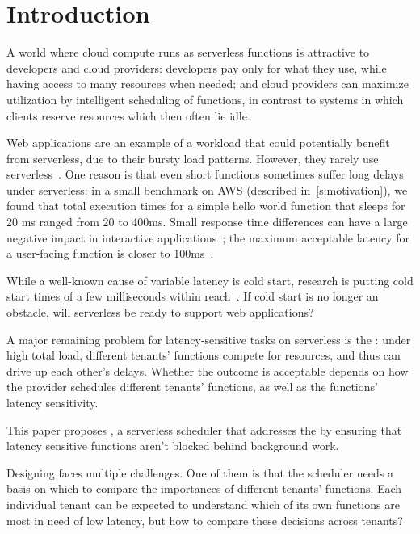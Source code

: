\section{Introduction}
\label{s:intro}

A world where cloud compute runs as serverless functions is attractive to
developers and cloud providers: developers pay only for what they use, while having
access to many resources when needed; and cloud providers can maximize
utilization by intelligent scheduling of functions, in contrast to systems in
which clients reserve resources which then often lie idle.

Web applications are an example of a workload that could potentially benefit
from serverless, due to their bursty load patterns. However, they rarely use
serverless~\cite{reddit-serverless1, reddit-serverless2, not-lambda-blog}. One
reason is that even short functions sometimes suffer long delays under
serverless: in a small benchmark on AWS (described in~\autoref{s:motivation}), we found that total execution times for a
simple hello world function that sleeps for 20 ms ranged from 20 to 400ms. Small
response time differences can have a large negative impact in interactive
applications~\cite{amz-page-load,google-page-load}; the maximum acceptable
latency for a user-facing function is closer to 100ms~\cite{page-load-time}.

While a well-known cause of variable latency is cold start, research is putting
cold start times of a few milliseconds within reach~\cite{sigmaos,mitosis}. If
cold start is no longer an obstacle, will serverless be ready to support web
applications?

A major remaining problem for latency-sensitive tasks on serverless is the
\emph{\problem{}}: under high total load, different tenants' functions compete
for resources, and thus can drive up each other's delays. Whether the outcome is
acceptable depends on how the provider schedules different tenants' functions,
as well as the functions' latency sensitivity.

This paper proposes \sys{}, a serverless scheduler that addresses the \problem{}
by ensuring that latency sensitive functions aren't blocked behind background
work.

Designing \sys{} faces multiple challenges. One of them is that the scheduler
needs a basis on which to compare the importances of different tenants'
functions. Each individual tenant can be expected to understand which of its own
functions are most in need of low latency, but how to compare these decisions
across tenants?

